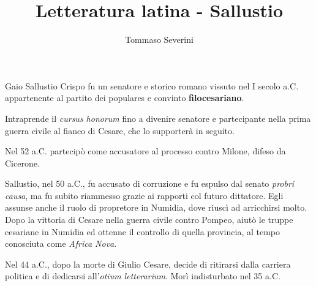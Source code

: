 \documentclass[10pt,a4paper]{article}
\author{Tommaso Severini}
\title{Letteratura latina - Sallustio}
\begin{document}
	\maketitle
	
	Gaio Sallustio Crispo fu un senatore e storico romano vissuto nel I secolo a.C. appartenente al partito dei populares e convinto \textbf{filocesariano}.
	
	Intraprende il \textit{cursus honorum} fino a divenire senatore e partecipante nella prima guerra civile al fianco di Cesare, che lo supporterà in seguito.
	
	Nel 52 a.C. partecipò come accusatore al processo contro Milone, difeso da Cicerone.
	
	Sallustio, nel 50 a.C., fu accusato di corruzione e fu espulso dal senato \textit{probri causa}, ma fu subito riammesso grazie ai rapporti col futuro dittatore. Egli assunse anche il ruolo di propretore in Numidia, dove riuscì ad arricchirsi molto. Dopo la vittoria di Cesare nella guerra civile contro Pompeo, aiutò le truppe cesariane in Numidia ed ottenne il controllo di quella provincia, al tempo conosciuta come \textit{Africa Nova}.
	
	Nel 44 a.C., dopo la morte di Giulio Cesare, decide di ritirarsi dalla carriera politica e di dedicarsi all'\textit{otium letterarium}. Morì indisturbato nel 35 a.C. 
\end{document}
